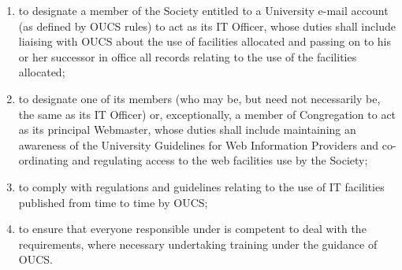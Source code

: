 \documentclass[11pt]{article}
\begin{document}
\begin{enumerate}
\begin{enumerate}
\item \label{it:des} to designate a member of the Society entitled to a University e-mail account (as defined by OUCS rules) to act as its IT Officer, whose duties shall include liaising with OUCS about the use of facilities allocated and passing on to his or her successor in office all records relating to the use of the facilities allocated;
\item to designate one of its members (who may be, but need not necessarily be, the same as its IT Officer) or, exceptionally, a member of Congregation to act as its principal Webmaster, whose duties shall include maintaining an awareness of the University Guidelines for Web Information Providers and co-ordinating and regulating access to the web facilities use by the Society;
\item to comply with regulations and guidelines relating to the use of IT facilities published from time to time by OUCS;
\item \label{it:res} to ensure that everyone responsible under  is competent to deal with the requirements, where necessary undertaking training under the guidance of OUCS.
\end{enumerate}
\end{enumerate}
\end{document}
